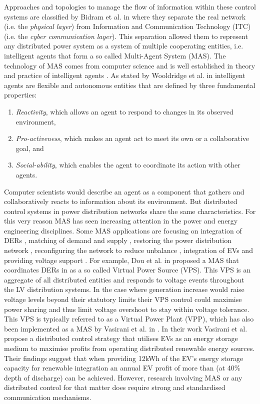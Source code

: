 Approaches and topologies to manage the flow of information within these control systems are classified by Bidram et al. in \cite{Bidram2014} where they separate the real network (i.e. the \textit{physical layer}) from Information and Communication Technology (ITC) (i.e. the \textit{cyber communication layer}).
This separation allowed them to represent any distributed power system as a system of multiple cooperating entities, i.e. intelligent agents that form a so called Multi-Agent System (MAS).
The technology of MAS comes from computer science and is well established in theory and practice of intelligent agents \cite{Russell2009}.
As stated by Wooldridge et al. in \cite{Wooldridge1995} intelligent agents are flexible and autonomous entities that are defined by three fundamental properties:

\begin{enumerate}
	\item \textit{Reactivity}, which allows an agent to respond to changes in its observed environment,
	\item \textit{Pro-activeness}, which makes an agent act to meet its own or a collaborative goal, and
	\item \textit{Social-ability}, which enables the agent to coordinate its action with other agents.
\end{enumerate}

Computer scientists would describe an agent as a component that gathers and collaboratively reacts to information about its environment.
But distributed control systems in power distribution networks share the same characteristics.
For this very reason MAS has seen increasing attention in the power and energy engineering disciplines.
Some MAS applications are focusing on integration of DERs \cite{Al-Hinai2004, Dimeas2005, Dou2017, Vasirani2013, Gomez-Sanz2014}, matching of demand and supply \cite{Kok2005}, restoring the power distribution network \cite{Li2012}, reconfiguring the network to reduce unbalance \cite{Ding2016}, integration of EVs \cite{Lopez2011, Karfopoulos2013, Ramachandran2013, GrauUnda2014} and providing voltage support \cite{Baran2007}.
For example, Dou et al. in \cite{Dou2017} proposed a MAS that coordinates DERs in as a so called Virtual Power Source (VPS).
This VPS is an aggregate of all distributed entities and responds to voltage events throughout the LV distribution systems.
In the case where generation increase would raise voltage levels beyond their statutory limits their VPS control could maximise power sharing and thus limit voltage overshoot to stay within voltage tolerance.
This VPS is typically referred to as a Virtual Power Plant (VPP), which has also been implemented as a MAS by Vasirani et al. in \cite{Vasirani2013}.
In their work Vasirani et al. propose a distributed control strategy that utilises EVs as an energy storage medium to maximise profits from operating distributed renewable energy sources.
Their findings suggest that when providing 12kWh of the EV's energy storage capacity for renewable integration an annual EV profit of more than  (at 40\% depth of discharge) can be achieved.
However, research involving MAS or any distributed control for that matter does require strong and standardised communication mechanisms.

